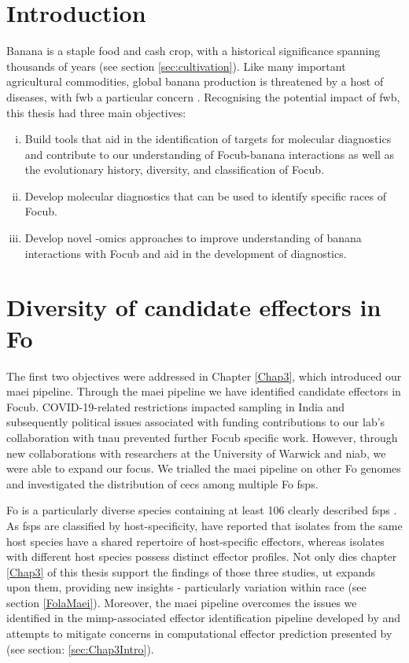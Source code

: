 
\section{Introduction}

Banana is a staple food and cash crop, with a historical significance spanning thousands of years (see section \ref{sec:cultivation}). Like many important agricultural commodities, global banana production is threatened by a host of diseases, with \Acf{fwb} a particular concern \parencite{Ploetz2005}. Recognising the potential impact of \ac{fwb}, this thesis had three main objectives:

\begin{enumerate}[i)]
    \item Build tools that aid in the identification of targets for molecular diagnostics and contribute to our understanding of \acf{Focub}-banana interactions as well as the evolutionary history, diversity, and classification of \ac{Focub}.
    \item Develop molecular diagnostics that can be used to identify specific races of \ac{Focub}. 
    \item Develop novel -omics approaches to improve understanding of banana interactions with \ac{Focub} and aid in the development of diagnostics.
\end{enumerate}

\section{Diversity of candidate effectors in \acl{Fo}}

The first two objectives were addressed in Chapter \ref{Chap3}, which introduced our \acf{maei} pipeline. Through the \ac{maei} pipeline we have identified candidate effectors in \ac{Focub}. COVID-19-related restrictions impacted sampling in India and subsequently political issues associated with funding contributions to our lab's collaboration with \acf{tnau} prevented further \ac{Focub} specific work. However, through new collaborations with researchers at the University of Warwick and \ac{niab}, we were able to expand our focus. We trialled the \ac{maei} pipeline on other \ac{Fo} genomes and investigated the distribution of \acfp{cec} among multiple \acf{Fo} \acfp{fsp}.  

\ac{Fo} is a particularly diverse species containing at least 106 clearly described \acp{fsp} \parencite{Edel-Hermann2019}. As \acp{fsp} are classified by host-specificity, \textcite{Dam2016,Dam2017,FoEC2} have reported that isolates from the same host species have a shared repertoire of host-specific effectors, whereas isolates with different host species possess distinct effector profiles. Not only dies chapter \ref{Chap3} of this thesis support the findings of those three studies, ut expands upon them, providing new insights - particularly variation within race (see section \ref{FolaMaei}). Moreover, the \ac{maei} pipeline overcomes the issues we identified in the \ac{mimp}-associated effector identification pipeline developed by \textcite{Dam2016} and attempts to mitigate concerns in computational effector prediction presented by \textcite{Sperschneider2015, LoPresti2015, Todd2022} (see section: \ref{sec:Chap3Intro}). 

